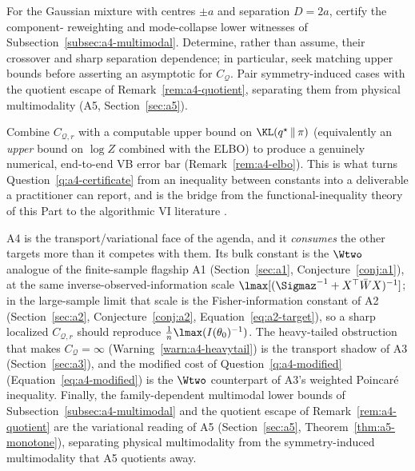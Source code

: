 \documentclass[../../main.tex]{subfiles}
\begin{document}
\begin{question}
\label{q:a4-multimodal}
For the Gaussian mixture with centres $\pm a$ and separation $D=2a$, certify the component-
reweighting and mode-collapse lower witnesses of Subsection~\ref{subsec:a4-multimodal}. Determine,
rather than assume, their crossover and sharp separation dependence; in particular, seek matching
upper bounds before asserting an asymptotic for $C_{\mathcal Q}$. Pair symmetry-induced cases with
the quotient escape of Remark~\ref{rem:a4-quotient}, separating them from physical multimodality
(A5, Section~\ref{sec:a5}).
\end{question}

\begin{question}
\label{q:a4-elbo}
Combine $C_{\mathcal Q,r}$ with a computable upper bound on $\KL(q^\star\,\|\,\pi)$
(equivalently an \emph{upper} bound on $\log Z$ combined with the ELBO) to produce a genuinely numerical,
end-to-end VB error bar (Remark~\ref{rem:a4-elbo}). This is what turns
Question~\ref{q:a4-certificate} from an inequality between constants into a deliverable a practitioner
can report, and is the bridge from the functional-inequality theory of this Part to the
algorithmic VI literature \cite{LambertEtAl2022,ArneseLacker2024,JiangChewiPooladian2023}.
\end{question}

\begin{remark}
\label{rem:a4-relations}
A4 is the transport/variational face of the agenda, and it \emph{consumes} the other targets more
than it competes with them. Its bulk constant is the $\Wtwo$ analogue of the finite-sample flagship
A1 (Section~\ref{sec:a1}, Conjecture~\ref{conj:a1}), at the same inverse-observed-information scale
$\lmax[(\Sigmaz^{-1}+X^\top\bar W X)^{-1}]$; in the large-sample limit that scale is the
Fisher-information constant of A2 (Section~\ref{sec:a2}, Conjecture~\ref{conj:a2},
Equation~\eqref{eq:a2-target}), so a sharp localized $C_{\mathcal Q,r}$ should reproduce
$\tfrac1n\lmax(I(\theta_0)^{-1})$. The heavy-tailed obstruction that makes $C_{\mathcal Q}=\infty$
(Warning~\ref{warn:a4-heavytail}) is the transport shadow of A3 (Section~\ref{sec:a3}), and the
modified cost of Question~\ref{q:a4-modified} (Equation~\eqref{eq:a4-modified}) is the $\Wtwo$
counterpart of A3's weighted Poincar\'e inequality. Finally, the family-dependent multimodal lower
bounds of Subsection~\ref{subsec:a4-multimodal} and the quotient escape of
Remark~\ref{rem:a4-quotient} are the variational reading of A5 (Section~\ref{sec:a5},
Theorem~\ref{thm:a5-monotone}), separating physical multimodality from the symmetry-induced
multimodality that A5 quotients away.
\end{remark}
\end{document}
